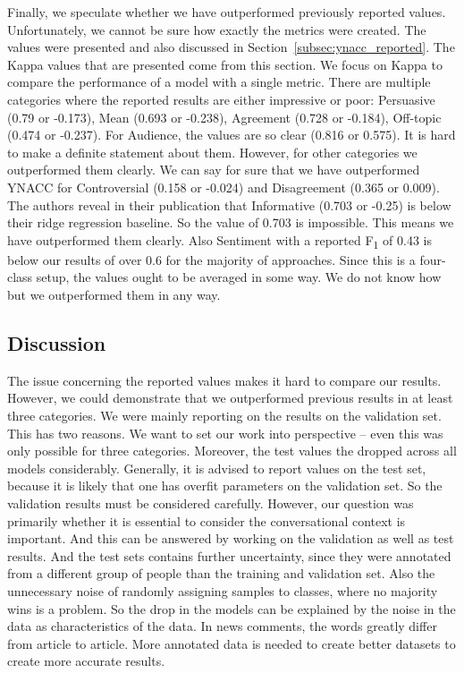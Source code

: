 Finally, we speculate whether we have outperformed previously reported values.
Unfortunately, we cannot be sure how exactly the metrics were created.
The values were presented and also discussed in Section~\ref{subsec:ynacc_reported}.
The Kappa values that are presented come from this section.
We focus on Kappa to compare the performance of a model with a single metric.
There are multiple categories where the reported results are either impressive or poor:
Persuasive (0.79 or -0.173), Mean (0.693 or -0.238), Agreement (0.728 or -0.184), Off-topic (0.474 or -0.237).
For Audience, the values are so clear (0.816 or 0.575).
It is hard to make a definite statement about them.
However, for other categories we outperformed them clearly.
We can say for sure that we have outperformed YNACC for Controversial (0.158 or -0.024) and Disagreement (0.365 or 0.009).
The authors reveal in their publication that Informative (0.703 or -0.25) is below their ridge regression baseline.
So the value of 0.703 is impossible.
This means we have outperformed them clearly.
Also Sentiment with a reported F\textsubscript{1} of 0.43 is below our results of over 0.6 for the majority of approaches.
Since this is a four-class setup, the values ought to be averaged in some way.
We do not know how but we outperformed them in any way.


\subsection{Discussion}


The issue concerning the reported values makes it hard to compare our results.
However, we could demonstrate that we outperformed previous results in at  least three categories.
We were mainly reporting on the results on the validation set.
This has two reasons.
We want to set our work into perspective -- even this was only possible for three categories.
Moreover, the test values the dropped across all models considerably.
Generally, it is advised to report values on the test set, because it is likely that one has overfit parameters on the validation set.
So the validation results must be considered carefully.
However, our question was primarily whether it is essential to consider the conversational context is important.
And this can be answered by working on the validation as well as test results.
And the test sets contains further uncertainty, since they were annotated from a different group of people than the training and validation set.
Also the unnecessary noise of randomly assigning samples to classes, where  no majority wins is a problem.
So the drop in the models can be explained by the noise in the data as characteristics of the data.
In news comments, the words greatly differ from article to article.
More annotated data is needed to create better datasets to create more accurate results.

